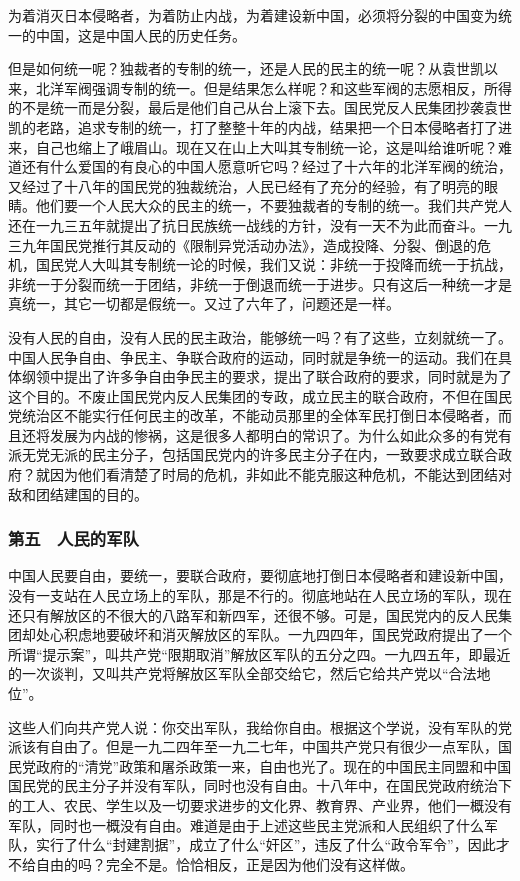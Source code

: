 为着消灭日本侵略者，为着防止内战，为着建设新中国，必须将分裂的中国变为统一的中国，这是中国人民的历史任务。

但是如何统一呢？独裁者的专制的统一，还是人民的民主的统一呢？从袁世凯以来，北洋军阀强调专制的统一。但是结果怎么样呢？和这些军阀的志愿相反，所得的不是统一而是分裂，最后是他们自己从台上滚下去。国民党反人民集团抄袭袁世凯的老路，追求专制的统一，打了整整十年的内战，结果把一个日本侵略者打了进来，自己也缩上了峨眉山。现在又在山上大叫其专制统一论，这是叫给谁听呢？难道还有什么爱国的有良心的中国人愿意听它吗？经过了十六年的北洋军阀的统治，又经过了十八年的国民党的独裁统治，人民已经有了充分的经验，有了明亮的眼睛。他们要一个人民大众的民主的统一，不要独裁者的专制的统一。我们共产党人还在一九三五年就提出了抗日民族统一战线的方针，没有一天不为此而奋斗。一九三九年国民党推行其反动的《限制异党活动办法》，造成投降、分裂、倒退的危机，国民党人大叫其专制统一论的时候，我们又说：非统一于投降而统一于抗战，非统一于分裂而统一于团结，非统一于倒退而统一于进步。只有这后一种统一才是真统一，其它一切都是假统一。又过了六年了，问题还是一样。

没有人民的自由，没有人民的民主政治，能够统一吗？有了这些，立刻就统一了。中国人民争自由、争民主、争联合政府的运动，同时就是争统一的运动。我们在具体纲领中提出了许多争自由争民主的要求，提出了联合政府的要求，同时就是为了这个目的。不废止国民党内反人民集团的专政，成立民主的联合政府，不但在国民党统治区不能实行任何民主的改革，不能动员那里的全体军民打倒日本侵略者，而且还将发展为内战的惨祸，这是很多人都明白的常识了。为什么如此众多的有党有派无党无派的民主分子，包括国民党内的许多民主分子在内，一致要求成立联合政府？就因为他们看清楚了时局的危机，非如此不能克服这种危机，不能达到团结对敌和团结建国的目的。

\subsubsection{第五　人民的军队}

中国人民要自由，要统一，要联合政府，要彻底地打倒日本侵略者和建设新中国，没有一支站在人民立场上的军队，那是不行的。彻底地站在人民立场的军队，现在还只有解放区的不很大的八路军和新四军，还很不够。可是，国民党内的反人民集团却处心积虑地要破坏和消灭解放区的军队。一九四四年，国民党政府提出了一个所谓“提示案”，叫共产党“限期取消”解放区军队的五分之四。一九四五年，即最近的一次谈判，又叫共产党将解放区军队全部交给它，然后它给共产党以“合法地位”。

这些人们向共产党人说：你交出军队，我给你自由。根据这个学说，没有军队的党派该有自由了。但是一九二四年至一九二七年，中国共产党只有很少一点军队，国民党政府的“清党”政策和屠杀政策一来，自由也光了。现在的中国民主同盟和中国国民党的民主分子并没有军队，同时也没有自由。十八年中，在国民党政府统治下的工人、农民、学生以及一切要求进步的文化界、教育界、产业界，他们一概没有军队，同时也一概没有自由。难道是由于上述这些民主党派和人民组织了什么军队，实行了什么“封建割据”，成立了什么“奸区”，违反了什么“政令军令”，因此才不给自由的吗？完全不是。恰恰相反，正是因为他们没有这样做。

